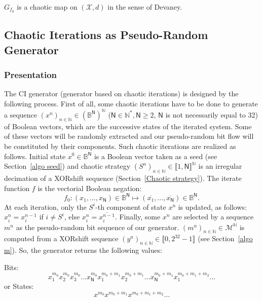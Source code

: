 \documentclass[journal]{IEEEtran}
\begin{document}
\begin{proposition}
$G_{f_0}$ is a chaotic map on $(\mathcal{X},d)$ in the sense of Devaney.
\end{proposition}




\subsection{Chaotic Iterations as Pseudo-Random Generator}
\subsubsection{Presentation}
The CI generator (generator based on chaotic iterations) is designed by the following process. First of all, some chaotic iterations have to be done to generate a sequence $\left(x^n\right)_{n\in\mathds{N}} \in \left(\mathds{B}^\mathsf{N}\right)^\mathds{N}$ ($\mathsf{N} \in \mathds{N}^*, \mathsf{N} \geqslant 2$, $\mathsf{N}$ is not necessarily equal to 32) of Boolean vectors, which are the successive states of the iterated system. Some of these vectors will be randomly extracted and our pseudo-random bit flow will be constituted by their components. Such chaotic iterations are realized as follows. Initial state $x^0 \in \mathds{B}^\mathsf{N}$ is a Boolean vector taken as a seed (see Section~\ref{algo seed}) and chaotic strategy $\left(S^n\right)_{n\in\mathds{N}}\in \llbracket 1, \mathsf{N} \rrbracket^\mathds{N}$ is
an irregular decimation of a XORshift sequence (Section~\ref{Chaotic strategy}). The iterate function $f$ is
the vectorial Boolean negation:
$$f_0:(x_1,...,x_\mathsf{N}) \in \mathds{B}^\mathsf{N} \longmapsto (\overline{x_1},...,\overline{x_\mathsf{N}}) \in \mathds{B}^\mathsf{N}.$$
At each iteration, only the $S^i$-th component of state $x^n$ is updated, as follows: $x_i^n = x_i^{n-1}$ if $i \neq S^i$, else $x_i^n = \overline{x_i^{n-1}}$.
Finally, some $x^n$ are selected
by a sequence $m^n$ as the pseudo-random bit sequence of our generator.
$(m^n)_{n \in \mathds{N}} \in \mathcal{M}^\mathds{N}$ is computed from a XORshift sequence $(y^n)_{n \in \mathds{N}} \in \llbracket 0, 2^{32}-1 \rrbracket$ (see Section~\ref{algo m}). So, the
generator returns the following values:\newline
\begin{small}
Bits:$$x_1^{m_0}x_2^{m_0}x_3^{m_0}\hdots x_\mathsf{N}^{m_0}x_1^{m_0+m_1}x_2^{m_0+m_1}\hdots x_\mathsf{N}^{m_0+m_1} x_1^{m_0+m_1+m_2}\hdots$$
or States:$$x^{m_0}x^{m_0+m_1}x^{m_0+m_1+m_2}\hdots$$
\end{small}
\end{document}
